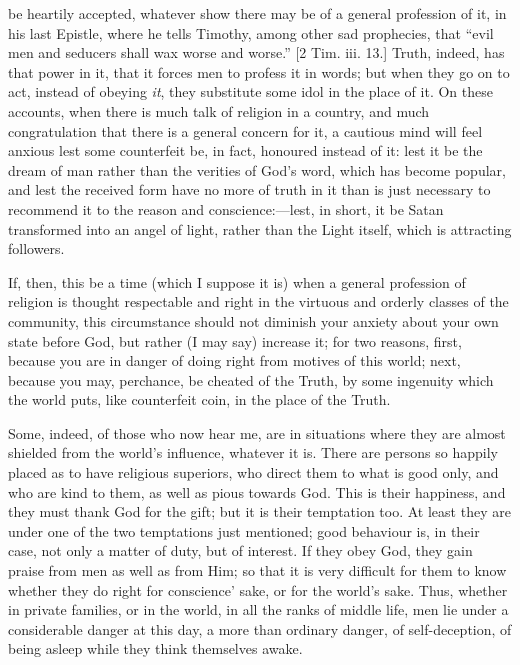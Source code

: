 be heartily accepted, whatever show there may be of a
general profession of it, in his last Epistle, where he
tells Timothy, among other sad prophecies, that
``evil men and seducers shall wax worse and
worse.'' [2 Tim. iii. 13.] Truth, indeed, has that
power in it, that it forces men to profess it in words;
but when they go on to act, instead of obeying \emph{it},
they substitute some idol in the place of it. On these
accounts, when there is much talk of religion in a
country, and much congratulation that there is a general
concern for it, a cautious mind will feel anxious lest
some counterfeit be, in fact, honoured instead of it:
lest it be the dream of man rather than the verities of
God's word, which has become popular, and lest the
received form have no more of truth in it than is just
necessary to recommend it to the reason and conscience:—lest, in short, it be Satan transformed
into an angel of light, rather than the Light itself,
which is attracting followers.

If, then, this be a time (which I suppose it is) when
a general profession of religion is thought respectable and right in the virtuous and orderly classes of the
community, this circumstance should not diminish your
anxiety about your own state before God, but rather (I
may say) increase it; for two reasons, first, because you
are in danger of doing right from motives of this world;
next, because you may, perchance, be cheated of the
Truth, by some ingenuity which the world puts, like
counterfeit coin, in the place of the Truth.

Some, indeed, of those who now hear me, are in
situations where they are almost shielded from the
world's influence, whatever it is. There are persons so
happily placed as to have religious superiors, who direct
them to what is good only, and who are kind to them, as
well as pious towards God. This is their happiness, and
they must thank God for the gift; but it is their
temptation too. At least they are under one of the two
temptations just mentioned; good behaviour is, in their
case, not only a matter of duty, but of interest. If they
obey God, they gain praise from men as well as from Him;
so that it is very difficult for them to know whether
they do right for conscience' sake, or for the world's
sake. Thus, whether in private families, or in the world,
in all the ranks of middle life, men lie under a
considerable danger at this day, a more than ordinary
danger, of self-deception, of being asleep while they
think themselves awake.

